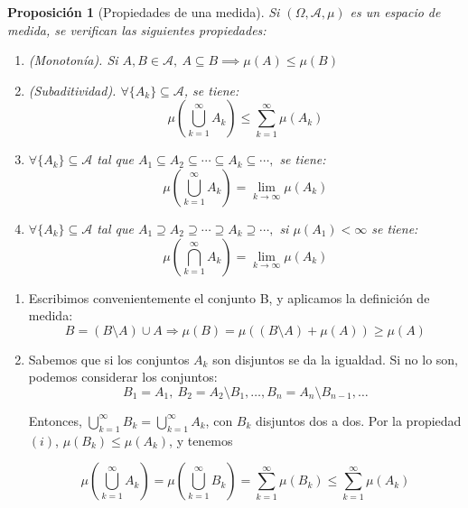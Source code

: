 \documentclass[11pt, a4paper]{article}
\makeatletter
\newif\IfInSansMode
\let\oldsf\sffamily
\renewcommand*{\sffamily}{\oldsf\mathversion{sans}\InSansModetrue}
\let\oldnorm\normalfont
\renewcommand*{\normalfont}{\oldnorm\InSansModefalse\mathversion{normal}}
\renewenvironment{proof}[1][\proofname] {\par\pushQED{\qed}\normalfont\topsep6\p@\@plus6\p@\relax\trivlist\item[\hskip\labelsep\itshape\sffamily#1\@addpunct{.}]\ignorespaces}{\popQED\endtrivlist\@endpefalse}
\theoremstyle{theorem-style}
\newtheorem{nprop}{Proposición}[section]
\theoremstyle{definition-style}
\theoremstyle{remark-style}
\theoremstyle{example-style}
\newenvironment{nlist}
{\begin{enumerate}
    \renewcommand\labelenumi{(\emph{\roman{enumi})}}}
  {\end{enumerate}}
\makeatother
\begin{document}
\begin{nprop}[Propiedades de una medida] \label{prop_medida} Si $(\Omega, \mathscr A, \mu)$ es un espacio de medida, se verifican las siguientes propiedades:
  \begin{nlist}
  \item (Monotonía). Si $A,B \in \mathscr A,\ A \subseteq B \implies \mu(A) \leq \mu(B)$
  \item (Subaditividad). $\forall \{A_k\} \subseteq \mathscr A$, se tiene:
    \[
      \mu\left( \bigcup_{k=1}^\infty A_k \right) \leq \sum_{k=1}^\infty \mu(A_k)
    \]
  \item $\forall \{A_k\} \subseteq \mathscr A$ tal que $A_1\subseteq A_2\subseteq \cdots \subseteq A_k \subseteq \cdots,$ se tiene:
    $$\mu \left( \bigcup_{k=1}^\infty A_k \right) = \lim_{k \to \infty}\mu(A_k)$$
  \item $\forall \{A_k\} \subseteq \mathscr A$ tal que $A_1\supseteq A_2\supseteq \cdots \supseteq A_k \supseteq \cdots,$ si $\mu(A_1) < \infty$ se tiene:
    $$\mu \left( \bigcap_{k=1}^\infty A_k \right) = \lim_{k \to \infty}\mu(A_k)$$
  \end{nlist}
\end{nprop}

\begin{proof}\hfill 
\begin{nlist}
    \item Escribimos convenientemente el conjunto B, y aplicamos la definición de medida:
$$B= ( B\setminus A) \cup A \Longrightarrow \mu(B)= \mu ( (B\setminus A) + \mu(A)) \geq \mu(A)	$$
\item Sabemos que si los conjuntos $A_k$ son disjuntos se da la igualdad. Si no lo son,  podemos considerar los conjuntos:
$$B_1=A_1, \ B_2=A_2\setminus B_1, \dots , B_n=A_n \setminus B_{n-1}, \dots $$

Entonces, $\bigcup_{k=1}^\infty B_k = \bigcup_{k=1}^\infty A_k$, con $B_k$  disjuntos dos a dos. Por la propiedad $(i)$,  $\mu (B_k) \leq \mu (A_k)$, y tenemos 

  $$\mu \left( \bigcup_{k=1}^\infty A_k \right) = \mu \left( \bigcup_{k=1}^\infty B_k \right) = \sum_{k=1}^\infty \mu(B_k) \leq \sum_{k=1}^\infty \mu(A_k)$$
\end{nlist}
\end{proof}
\end{document}
